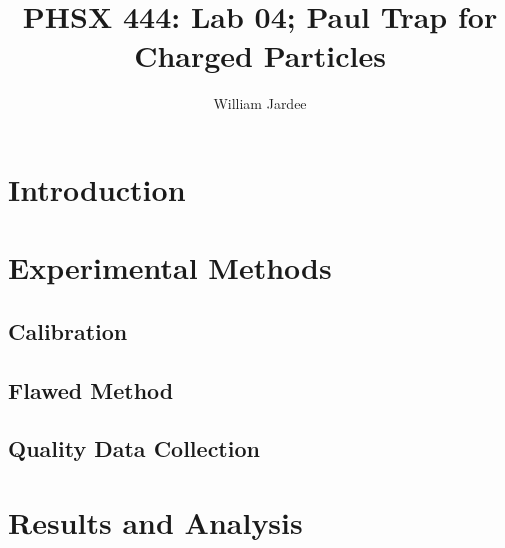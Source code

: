 \documentclass[12pt]{article}
\begin{document}
\title{PHSX 444: Lab 04; Paul Trap for Charged Particles}
\author{William Jardee}
\maketitle


\section{Introduction}



\section{Experimental Methods}

\subsection{Calibration}

\subsection{Flawed Method}

\subsection{Quality Data Collection}



\section{Results and Analysis}
\end{document}
